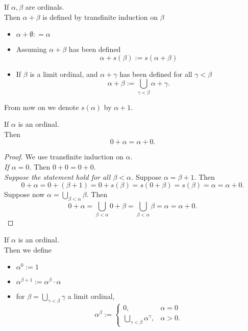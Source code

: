 \begin{definition}
    If $\alpha, \beta$ are ordinals.\\
    Then $\alpha + \beta$ is defined by transfinite induction on $\beta$
    \begin{itemize}[label=-]
        \item $\alpha + \emptyset : = \alpha$
        \item Assuming $\alpha + \beta$ has been defined
        $$\alpha + s(\beta) := s(\alpha + \beta)$$
        \item If $\beta$ is a limit ordinal, and $\alpha + \gamma$ has been defined for all $\gamma < \beta$
        $$ \alpha + \beta := \bigcup_{\gamma < \beta} \alpha + \gamma. $$
    \end{itemize}
\end{definition}

\begin{notation}
    From now on we denote $s(\alpha)$ by $\alpha + 1$.
\end{notation}

\begin{example}
    If $\alpha$ is an ordinal.\\
    Then $$ 0 + \alpha = \alpha + 0. $$
\end{example}
\begin{proof}
    We use transfinite induction on $\alpha$.\\
    \emph{If $\alpha = 0$.} Then $0 + 0 = 0 + 0$.\\
    \emph{Suppose the statement hold for all $\beta < \alpha$.} Suppose $\alpha = \beta + 1$. Then
    $$ 0 + \alpha = 0 + (\beta + 1) = 0 + s(\beta) = s(0 + \beta) = s(\beta) = \alpha = \alpha + 0.$$
    Suppose now $\alpha = \bigcup_{\beta < \alpha} \beta$. Then
    $$ 0 + \alpha = \bigcup_{\beta < \alpha} 0 + \beta = \bigcup_{\beta < \alpha} \beta = \alpha = \alpha + 0. $$
\end{proof}

\begin{definition}
    If $\alpha$ is an ordinal.\\
    Then we define
    \begin{itemize}
        \item $\alpha^0 := 1$
        \item $\alpha^{\beta + 1} := \alpha^\beta \cdot \alpha$
        \item for $\beta = \bigcup_{\gamma < \beta} \gamma$ a limit ordinal,
        $$ \alpha^\beta := \begin{cases}
            0, & \alpha = 0\\
            \bigcup_{\gamma < \beta} \alpha^\gamma,& \alpha > 0.
        \end{cases}$$
    \end{itemize}
\end{definition}

